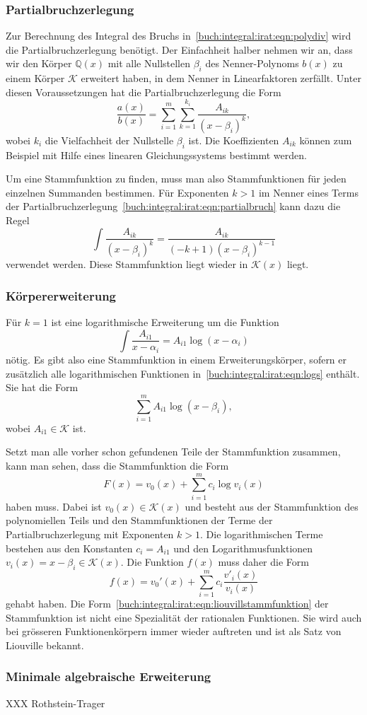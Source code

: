 \subsubsection{Partialbruchzerlegung}
Zur Berechnung des Integral des Bruchs
in~\eqref{buch:integral:irat:eqn:polydiv} wird die Partialbruchzerlegung
benötigt.
Der Einfachheit halber nehmen wir an, dass wir den Körper $\mathbb{Q}(x)$
mit alle Nullstellen $\beta_i$ des Nenner-Polynoms $b(x)$ zu einem Körper
$\mathscr{K}$ erweitert haben, in dem Nenner in Linearfaktoren zerfällt.
Unter diesen Voraussetzungen hat die Partialbruchzerlegung die Form
\begin{equation}
\frac{a(x)}{b(x)}
=
\sum_{i=1}^m
\sum_{k=1}^{k_i}
\frac{A_{ik}}{(x-\beta_i)^k},
\label{buch:integral:irat:eqn:partialbruch}
\end{equation}
wobei $k_i$ die Vielfachheit der Nullstelle $\beta_i$ ist.
Die Koeffizienten $A_{ik}$ können zum Beispiel mit Hilfe eines linearen
Gleichungssystems bestimmt werden.

Um eine Stammfunktion zu finden, muss man also Stammfunktionen für
jeden einzelnen Summanden bestimmen.
Für Exponenten $k>1$ im Nenner eines Terms der
Partialbruchzerlegung~\eqref{buch:integral:irat:eqn:partialbruch}
kann dazu die Regel
\[
\int \frac{A_{ik}}{(x-\beta_i)^k}
=
\frac{A_{ik}}{(-k+1)(x-\beta_i)^{k-1}}
\]
verwendet werden.
Diese Stammfunktion liegt wieder in $\mathscr{K}(x)$ liegt.

%
%
\subsubsection{Körpererweiterung}
Für $k=1$ ist eine logarithmische Erweiterung um die Funktion
\begin{equation}
\int \frac{A_{i1}}{x-\alpha_i}
=
A_{i1}
\log(x-\alpha_i)
\label{buch:integral:irat:eqn:logs}
\end{equation}
nötig.
Es gibt also eine Stammfunktion in einem Erweiterungskörper, sofern
er zusätzlich alle logarithmischen Funktionen
in~\ref{buch:integral:irat:eqn:logs} enthält.
Sie hat die Form
\[
\sum_{i=1}^m A_{i1} \log(x-\beta_i),
\]
wobei $A_{i1}\in\mathscr{K}$ ist.

Setzt man alle vorher schon gefundenen Teile der Stammfunktion zusammen,
kann man sehen, dass die Stammfunktion die Form
\begin{equation}
F(x) = v_0(x) + \sum_{i=1}^m c_i \log v_i(x)
\label{buch:integral:irat:eqn:liouvillstammfunktion}
\end{equation}
haben muss.
Dabei ist $v_0(x)\in\mathscr{K}(x)$ und besteht aus der Stammfunktion
des polynomiellen Teils und den Stammfunktionen der Terme der Partialbruchzerlegung mit Exponenten $k>1$.
Die logarithmischen Terme bestehen aus den Konstanten $c_i=A_{i1}$ 
und den Logarithmusfunktionen $v_i(x)=x-\beta_i\in\mathscr{K}(x)$.
Die Funktion $f(x)$ muss daher die Form
\[
f(x)
=
v_0'(x)
+
\sum_{i=1}^m c_i\frac{v'_i(x)}{v_i(x)}
\]
gehabt haben.
Die Form~\eqref{buch:integral:irat:eqn:liouvillstammfunktion}
der Stammfunktion ist nicht eine Spezialität der rationalen Funktionen.
Sie wird auch bei grösseren Funktionenkörpern immer wieder auftreten
und ist als Satz von Liouville bekannt.

%
%
\subsubsection{Minimale algebraische Erweiterung}
XXX Rothstein-Trager


